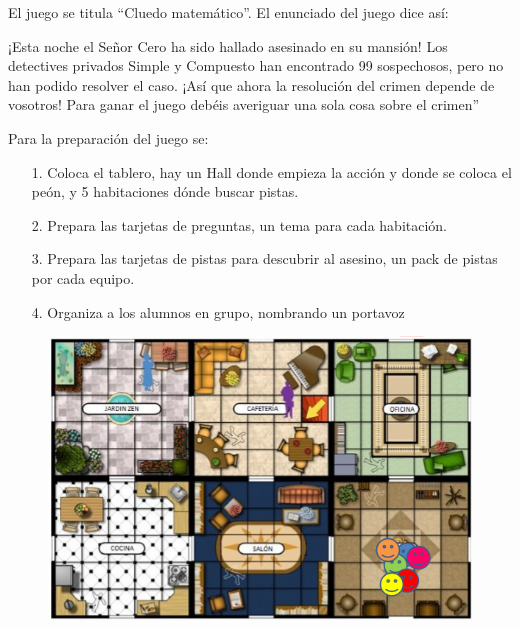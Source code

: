 El juego se titula “Cluedo matemático”. El enunciado del juego dice así:

¡Esta noche el Señor Cero ha sido hallado asesinado en su mansión! Los detectives privados Simple y Compuesto han encontrado 99 sospechosos, pero no han podido resolver el caso. ¡Así que ahora la resolución del crimen depende de vosotros! Para ganar el juego debéis averiguar una sola cosa sobre el crimen”

Para la preparación del juego se:
\begin{itemize}
\item[1.] Coloca el tablero, hay un Hall donde empieza la acción y donde se coloca el peón, y 5 habitaciones dónde buscar pistas.

\item[2.] Prepara las tarjetas de preguntas, un tema para cada habitación.

 \item[3.] Prepara las tarjetas de pistas para descubrir al asesino, un pack de pistas por cada equipo.

\item[4.] Organiza a los alumnos en grupo, nombrando un portavoz
\end{itemize}

 \begin{figure}[h]
 \centering
\includegraphics[scale=0.6]{img/cluedo2.jpg}
\end{figure}

